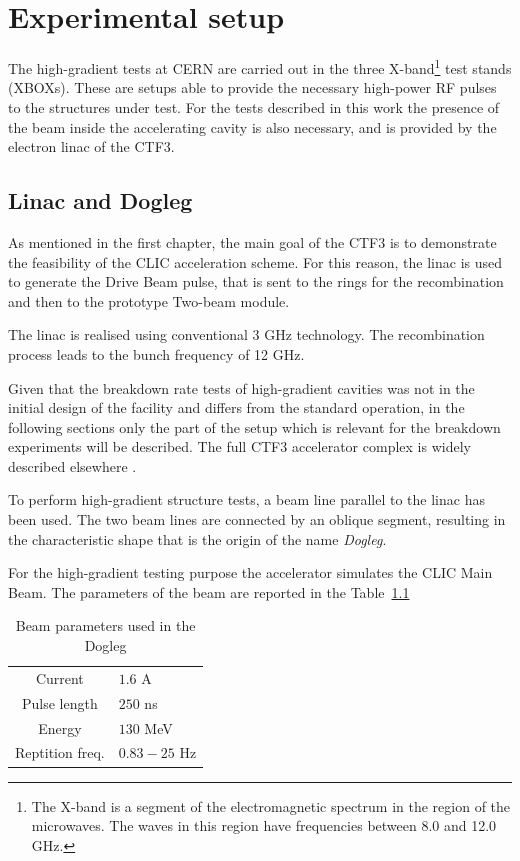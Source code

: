 \chapter[Experimental setup]{Experimental setup}
\label{chap:setup}

The high-gradient tests at CERN are carried out in the three X-band\footnote{The X-band is a segment of the electromagnetic spectrum in the region of the microwaves. The waves in this region have frequencies between 8.0 and 12.0 GHz.} test stands (XBOXs). These are setups able to provide the necessary high-power RF pulses to the structures under test. For the tests described in this work the presence of the beam inside the accelerating cavity is also necessary, and is provided by the electron linac of the CTF3. 


\section[Linac and dogleg]{Linac and Dogleg}

As mentioned in the first chapter, the main goal of the CTF3 is to demonstrate the feasibility of the CLIC acceleration scheme. For this reason, the linac is used to generate the Drive Beam pulse, that is sent to the rings for the recombination and then to the prototype Two-beam module. 

The linac is realised using conventional 3 GHz technology. The recombination process leads to the bunch frequency of 12 GHz. 

Given that the breakdown rate tests of high-gradient cavities was not in the initial design of the facility and differs from the standard operation, in the following sections only the part of the setup which is relevant for the breakdown experiments will be described. The full CTF3 accelerator complex is widely described elsewhere \cite{CLIC:cdr,CTF:drive_beam,ctf3:dr}. 

To perform high-gradient structure tests, a beam line parallel to the linac has been used. The two beam lines are connected by an oblique segment, resulting in the characteristic shape that is the origin of the name \textit{Dogleg}.

For the high-gradient testing purpose the accelerator  simulates the CLIC Main Beam. The parameters of the beam are reported in the Table~\ref{beam_par_dogleg}


\begin{table}
  \centering
    \begin{tabular}{ c l }
    \hline
    \hline
    Current 		&	$1.6$ A\\
    Pulse length		&	$250$ ns\\
    Energy			&	$130$ MeV\\
    Reptition freq.	&	$0.83-25$ Hz\\
    \hline
    \hline
    \end{tabular}
\caption{Beam parameters used in the Dogleg \cite{NavarroQuirante:2025954}}
\label{beam_par_dogleg}
\end{table}



